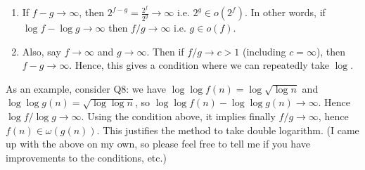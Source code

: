\documentclass{scrartcl}
\begin{document}
\begin{itemize}
\begin{enumerate}
    \item If $f-g \to \infty$, then $2^{f-g} = \frac{2^f}{2^g} \to \infty$ i.e. $2^g \in o(2^f)$. In other words, if $\log{f}-\log{g} \to \infty$ then $f/g \to \infty$ i.e. $g \in o(f)$. 
    \item Also, say $f \to \infty$ and $g \to \infty$. Then if $f/g \to c>1$ (including $c=\infty$), then $f-g \to \infty$. Hence, this gives a condition where we can repeatedly take $\log$.
  \end{enumerate} As an example, consider Q8: we have $\log\log f(n) = \log\sqrt{\log{n}}$ and $\log\log g(n) = \sqrt{\log\log{n}}$, so $\log\log f(n) - \log\log g(n) \to \infty$. Hence $\log{f}/\log{g} \to \infty$. Using the condition above, it implies finally $f/g \to \infty$, hence $f(n) \in \omega(g(n))$. This justifies the method to take double logarithm. (I came up with the above on my own, so please feel free to tell me if you have improvements to the conditions, etc.)
\end{itemize}
\end{document}
